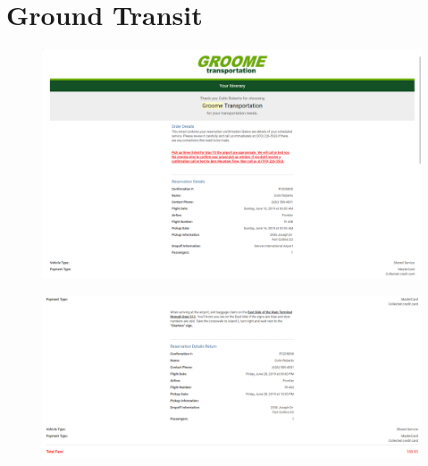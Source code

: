 \documentclass[12pt]{article}
\begin{document}
\section{Ground Transit}
\begin{figure}[H]
    \centering
    \includegraphics[width=\textwidth]{groome_1.png}
\end{figure}
\begin{figure}[H]
    \centering
    \includegraphics[width=\textwidth]{groome_2.png}
\end{figure}
\end{document}
